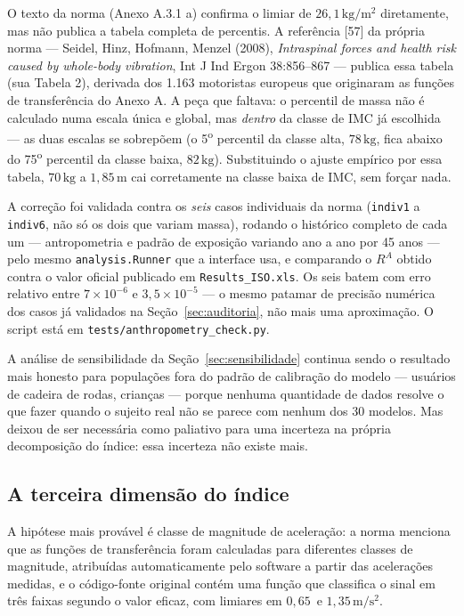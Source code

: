 \documentclass[11pt,a4paper]{article}
\newcommand{\code}[1]{\texttt{\small #1}}
\newcommand{\unit}[2]{\ensuremath{#1\,\mathrm{#2}}}
\begin{document}
O texto da norma (Anexo A.3.1 a) confirma o limiar de \unit{26{,}1}{kg/m^2}
diretamente, mas não publica a tabela completa de percentis. A referência
[57] da própria norma --- Seidel, Hinz, Hofmann, Menzel (2008), \emph{Intraspinal
forces and health risk caused by whole-body vibration}, Int J Ind Ergon
38:856--867 --- publica essa tabela (sua Tabela 2), derivada dos 1.163
motoristas europeus que originaram as funções de transferência do Anexo A. A
peça que faltava: o percentil de massa não é calculado numa escala única e
global, mas \emph{dentro} da classe de IMC já escolhida --- as duas escalas se
sobrepõem (o 5\textsuperscript{o} percentil da classe alta, \unit{78}{kg}, fica
abaixo do 75\textsuperscript{o} percentil da classe baixa, \unit{82}{kg}).
Substituindo o ajuste
empírico por essa tabela, \unit{70}{kg} a \unit{1{,}85}{m} cai corretamente na
classe baixa de IMC, sem forçar nada.

A correção foi validada contra os \emph{seis} casos individuais da norma
(\code{indiv1} a \code{indiv6}, não só os dois que variam massa), rodando o
histórico completo de cada um --- antropometria e padrão de exposição variando
ano a ano por 45 anos --- pelo mesmo \code{analysis.Runner} que a interface usa,
e comparando o $R^A$ obtido contra o valor oficial publicado em
\code{Results\_ISO.xls}. Os seis batem com erro relativo entre $7\times10^{-6}$
e $3{,}5\times10^{-5}$ --- o mesmo patamar de precisão numérica dos casos já
validados na Seção~\ref{sec:auditoria}, não mais uma aproximação. O script está
em \code{tests/anthropometry\_check.py}.

A análise de sensibilidade da Seção~\ref{sec:sensibilidade} continua sendo o
resultado mais honesto para populações fora do padrão de calibração do modelo
--- usuários de cadeira de rodas, crianças --- porque nenhuma quantidade de
dados resolve o que fazer quando o sujeito real não se parece com nenhum dos
30 modelos. Mas deixou de ser necessária como paliativo para uma incerteza na
própria decomposição do índice: essa incerteza não existe mais.

\subsection{A terceira dimensão do índice}

A hipótese mais provável é classe de magnitude de aceleração: a norma menciona
que as funções de transferência foram calculadas para diferentes classes de
magnitude, atribuídas automaticamente pelo software a partir das acelerações
medidas, e o código-fonte original contém uma função que classifica o sinal em
três faixas segundo o valor eficaz, com limiares em \unit{0{,}65}{} e
\unit{1{,}35}{m/s^2}.
\end{document}

